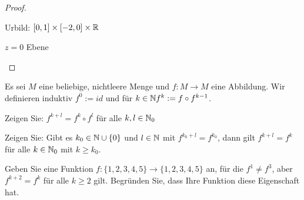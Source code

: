 \begin{proof}
\begin{parts}
\begin{minipage}{0.4\textwidth}
\begin{center}
			\end{center}
		\end{minipage}
		\begin{minipage}{0.4\textwidth}
			Urbild: $[0,1]\times [-2,0]\times \mathbb{R}$
			 \begin{center}
				 $z=0$ Ebene


			\end{center}
		\end{minipage}
	\end{parts}
\end{proof}
\begin{Problem}
		Es sei $M$ eine beliebige, nichtleere Menge und $f : M \to M$ eine Abbildung. Wir definieren induktiv $f^0 := id$ und f\"{u}r $k \in \mathbb{N} f^k := f \circ f^{k-1}$.

		\begin{parts}
		\item Zeigen Sie: $f^{k+l} = f^k \circ f^l$ f\"{u}r alle $k, l \in \mathbb{N}_0$
		\item Zeigen Sie: Gibt es $k_0 \in \mathbb{N} \cup \{0\}$ und $l \in \mathbb{N}$ mit $f^{k_0+l} = f^{k_0}$, dann gilt $f^{k+l} = f^k$ f\"{u}r alle $k \in \mathbb{N}_0$ mit $k\ge k_0$.
		\item Geben Sie eine Funktion $f : \{1, 2, 3, 4, 5\} \to \{1, 2, 3, 4, 5\}$ an, f\"{u}r die $f^1\neq f^3$, aber $f^{k+2} = f^k$ f\"{u}r alle $k\ge 2$ gilt. Begr\"{u}nden Sie, dass Ihre Funktion diese Eigenschaft hat.
		\end{parts}
\end{Problem}

